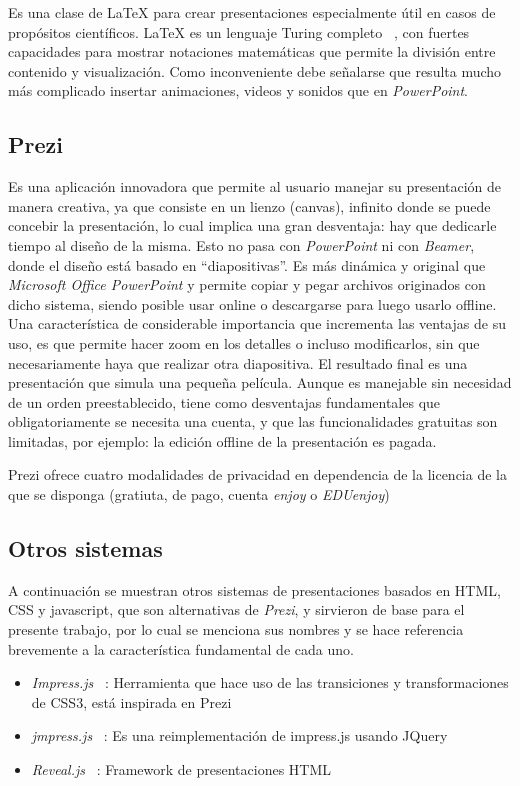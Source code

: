 			Es una clase de \LaTeX{} para crear presentaciones especialmente útil en casos de propósitos científicos. \LaTeX{} es un lenguaje Turing completo ~\cite{turing}, con fuertes capacidades para mostrar notaciones matemáticas que permite la división entre contenido y visualización. Como inconveniente debe señalarse que resulta mucho más complicado insertar animaciones, videos y sonidos que en \textit{PowerPoint}.	


		\subsection{Prezi} %
		\label{sub:prezi}

			Es una aplicación innovadora que permite al usuario manejar su presentación de manera creativa, ya que consiste en un lienzo (canvas), infinito donde se puede concebir la presentación, lo cual implica una gran desventaja: hay que dedicarle tiempo al diseño de la misma. Esto no pasa con \textit{PowerPoint} ni con \textit{Beamer}, donde el diseño está basado en ``diapositivas''. Es más dinámica y original que \textit{Microsoft Office PowerPoint} y permite copiar y pegar archivos originados con dicho sistema, siendo posible usar online o descargarse para luego usarlo offline.  Una característica de considerable importancia que incrementa las ventajas de su uso, es que permite hacer zoom en los detalles o incluso modificarlos, sin que necesariamente haya que realizar otra diapositiva. El resultado final es una presentación que simula una pequeña película. Aunque es manejable sin necesidad de un orden preestablecido, tiene como desventajas fundamentales que obligatoriamente se necesita una cuenta, y que las funcionalidades gratuitas son limitadas, por ejemplo: la edición offline de la presentación es pagada.

			Prezi ofrece cuatro modalidades de privacidad en dependencia de la licencia de la que se disponga (gratiuta, de pago, cuenta \textit{enjoy} o \textit{EDUenjoy})		


		\subsection{Otros sistemas} %
		\label{sub:otros_sistemas}
			A continuación se muestran otros sistemas de presentaciones basados en HTML, CSS y javascript, que son alternativas de \textit{Prezi}, y sirvieron de base para el presente trabajo, por lo cual se menciona sus nombres y se hace referencia brevemente a la característica fundamental de cada uno.
			\begin{itemize}
				\item \textit{Impress.js} ~\cite{impress}: Herramienta que hace uso de las transiciones y transformaciones de CSS3, está inspirada en Prezi
				\item \textit{jmpress.js} ~\cite{jmpress}: Es una reimplementación de impress.js usando JQuery
				\item \textit{Reveal.js} ~\cite{reveal}: Framework de presentaciones HTML
			\end{itemize}
	
